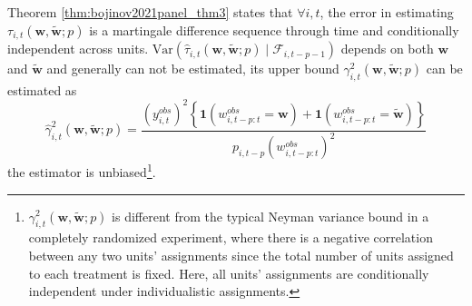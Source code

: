\documentclass[twoside]{article}
\begin{document}
Theorem \ref{thm:bojinov2021panel_thm3} states that $\forall i,t$, the error in estimating $\tau_{i,t}\left(\mathbf{w},\tilde{\mathbf{w}};p\right)$ is a martingale difference sequence through time and conditionally independent across units.
$\mathrm{Var}\left(\hat{\tau}_{i,t}\left(\mathbf{w},\tilde{\mathbf{w}};p\right)\mid \mathcal{F}_{i,t-p-1}\right)$ depends on both $\mathbf{w}$ and $\tilde{\mathbf{w}}$ and generally can not be estimated, its upper bound $\gamma^2_{i,t}\left(\mathbf{w},\tilde{\mathbf{w}};p\right)$ can be estimated as $$ \hat{\gamma}^2_{i,t}\left(\mathbf{w},\tilde{\mathbf{w}};p\right) = \frac{\left(y^{obs}_{i,t}\right)^2 \left\{\mathbf{1} \left(w^{obs}_{i,t-p:t}=\mathbf{w}\right) + \mathbf{1}\left(w^{obs}_{i,t-p:t}=\tilde{\mathbf{w}}\right) \right\}}{ p_{i,t-p}\left(w^{obs}_{i,t-p:t}\right)^2 } $$
the estimator is unbiased\footnote{$\gamma^2_{i,t}\left(\mathbf{w},\tilde{\mathbf{w}};p\right)$ is different from the typical Neyman variance bound in a completely randomized experiment, where there is a negative correlation between any two units' assignments since the total number of units assigned to each treatment is fixed. Here, all units' assignments are conditionally independent under individualistic assignments.}.
\end{document}
